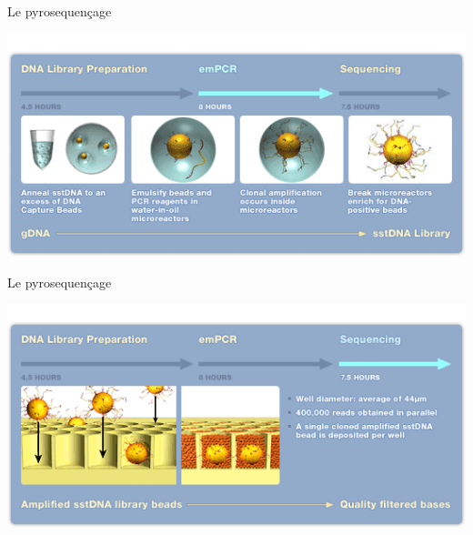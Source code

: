 \documentclass[12pt]{beamer}
\begin{document}
\begin{frame}{Le pyrosequençage}
\begin{center}
\includegraphics[scale=0.6]{./img/microbille.png}
\end{center}
\end{frame}


\begin{frame}{Le pyrosequençage}
\begin{center}
\includegraphics[scale=0.6]{./img/incbil.png}
\end{center}
\end{frame}
\end{document}
